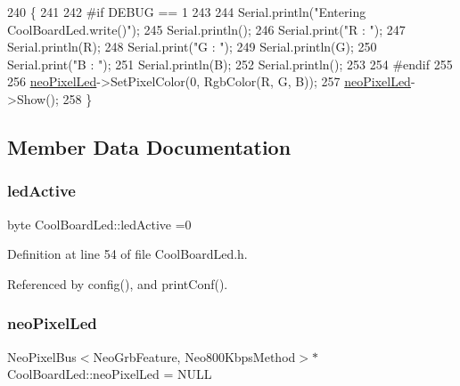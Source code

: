 \begin{DoxyCode}
240 \{
241 
242 \textcolor{preprocessor}{#if DEBUG == 1}
243 
244     Serial.println(\textcolor{stringliteral}{"Entering CoolBoardLed.write()"});
245     Serial.println();
246     Serial.print(\textcolor{stringliteral}{"R : "});
247     Serial.println(R);
248     Serial.print(\textcolor{stringliteral}{"G : "});
249     Serial.println(G);
250     Serial.print(\textcolor{stringliteral}{"B : "});
251     Serial.println(B);
252     Serial.println();   
253 
254 \textcolor{preprocessor}{#endif}
255 
256     \hyperlink{classCoolBoardLed_ac2c13fa462a010cd9242bf297c013923}{neoPixelLed}->SetPixelColor(0, RgbColor(R, G, B));
257     \hyperlink{classCoolBoardLed_ac2c13fa462a010cd9242bf297c013923}{neoPixelLed}->Show();
258 \}
\end{DoxyCode}


\subsection{Member Data Documentation}
\mbox{\label{classCoolBoardLed_a5f17c135516fcf4b44ea8a096ba0177a}} 
\subsubsection{\texorpdfstring{led\+Active}{ledActive}}
{\footnotesize\ttfamily byte Cool\+Board\+Led\+::led\+Active =0\hspace{0.3cm}{\ttfamily [private]}}



Definition at line 54 of file Cool\+Board\+Led.\+h.



Referenced by config(), and print\+Conf().

\mbox{\label{classCoolBoardLed_ac2c13fa462a010cd9242bf297c013923}} 
\subsubsection{\texorpdfstring{neo\+Pixel\+Led}{neoPixelLed}}
{\footnotesize\ttfamily Neo\+Pixel\+Bus$<$Neo\+Grb\+Feature, Neo800\+Kbps\+Method$>$$\ast$ Cool\+Board\+Led\+::neo\+Pixel\+Led = N\+U\+LL\hspace{0.3cm}{\ttfamily [private]}}



